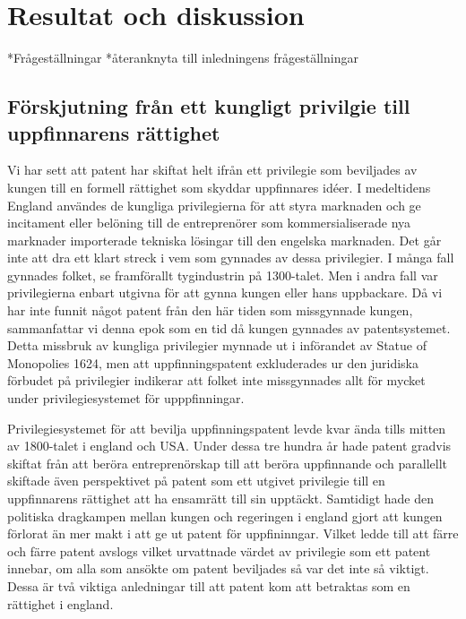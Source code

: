 \section{Resultat och diskussion}
\label{sec:disk}



*Frågeställningar
*återanknyta till inledningens frågeställningar



\subsection{Förskjutning från ett kungligt privilgie till uppfinnarens rättighet}
Vi har sett att patent har skiftat helt ifrån ett privilegie som beviljades av kungen till en formell rättighet som skyddar uppfinnares idéer. I medeltidens England användes de kungliga privilegierna för att styra marknaden och ge incitament eller belöning till de entreprenörer som kommersialiserade nya marknader importerade tekniska lösingar till den engelska marknaden. Det går inte att dra ett klart streck i vem som gynnades av dessa privilegier. I många fall gynnades folket, se framförallt tygindustrin på 1300-talet. Men i andra fall var privilegierna enbart utgivna för att gynna kungen eller hans uppbackare.%
Då vi har inte funnit något patent från den här tiden som missgynnade kungen, sammanfattar vi denna epok som en tid då kungen gynnades av patentsystemet. Detta missbruk av kungliga privilegier mynnade ut i införandet av Statue of Monopolies 1624, men att uppfinningspatent exkluderades ur den juridiska förbudet på privilegier indikerar att folket inte missgynnades allt för mycket under privilegiesystemet för upppfinningar.

Privilegiesystemet för att bevilja uppfinningspatent levde kvar ända tills mitten av 1800-talet i england och USA. Under dessa tre hundra år hade patent gradvis skiftat från att beröra entreprenörskap till att beröra uppfinnande och parallellt skiftade även perspektivet på patent som ett utgivet privilegie till en uppfinnarens rättighet att ha ensamrätt till sin upptäckt. Samtidigt hade den politiska dragkampen mellan kungen och regeringen i england gjort att kungen förlorat än mer makt i att ge ut patent för uppfininngar. Vilket ledde till att färre och färre patent avslogs vilket urvattnade värdet av privilegie som ett patent innebar, om alla som ansökte om patent beviljades så var det inte så viktigt. Dessa är två viktiga anledningar till att patent kom att betraktas som en rättighet i england.

